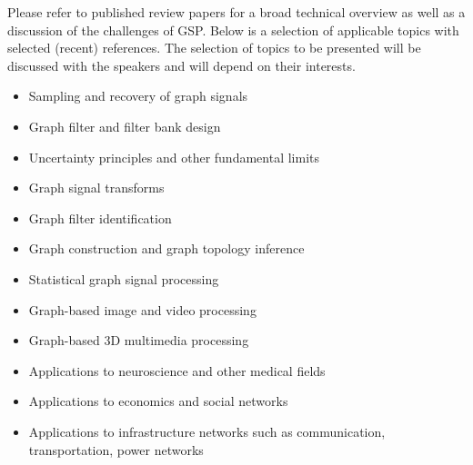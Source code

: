 \documentclass[a4paper]{scrartcl}
\begin{document}
Please refer to published review papers \cite{shuman_emerging_2013,
sandryhaila_discrete_2014, coifman_diffusion_2006, ekambaram_circulant_2013} for
a broad technical overview as well as a discussion of the challenges of GSP.
Below is a selection of applicable topics with selected (recent) references. The
selection of topics to be presented will be discussed with the speakers and will
depend on their interests.
\begin{itemize}
	\setlength{\itemsep}{0pt} \setlength{\parskip}{0pt}
	\item Sampling and recovery of graph signals \cite{puy2015random,tsitsvero2015signals,anis2014towards}
	\item Graph filter and filter bank design \cite{hammond2011wavelets,narang_bior_filters,ekambaram_globalsip,leonardi_multislice,leonardi_fmri,shuman2013spectrum}
	\item Uncertainty principles and other fundamental limits \cite{perraudin2016global,agaskar_spie,pasdeloup}
	\item Graph signal transforms \cite{szlam,gavish,Maggioni_biorthogonal,coifman_diffusion_2006,lafon_coarse,narang_lifting_graphs}
	\item Graph filter identification \cite{thanou_TSP_2014}
	\item Graph construction and graph topology inference \cite{kalofolias2016learn,Dong:2014tj}
	\item Statistical graph signal processing \cite{perraudin2016stationary,zhang2015graph,gadde2015probabilistic}
	\item Graph-based image and video processing \cite{elmoataz2008nonlocal,lezoray2008nonlocal,shahid2015fast}
	\item Graph-based 3D multimedia processing \cite{zhang2014point,
		thanou2015graph, nguyen2014compression, schoenenberger2015graph}
	\item Applications to neuroscience and other medical fields \cite{huang2015graph,hu2015spectral}
	\item Applications to economics and social networks
	\item Applications to infrastructure networks such as communication, transportation, power networks \cite{mcgraw,jain2014big,borgnat2011shared}

\end{itemize}
\end{document}
